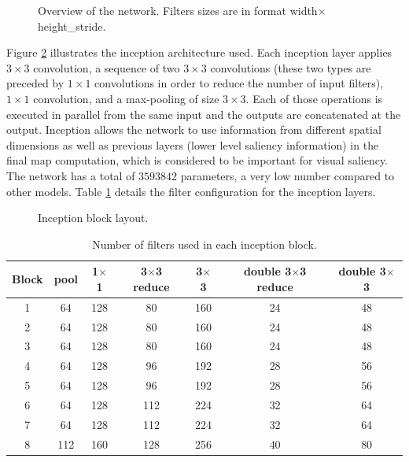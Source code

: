 \documentclass[10pt,twocolumn,letterpaper]{article}
\begin{document}
\begin{figure}
\begin{center}
\def\svgwidth{1.5\columnwidth}

\label{fig:model}
    \caption{Overview of the network.
        Filters sizes are in format width$\times$height\_stride.}
\end{center}
\end{figure}

Figure \ref{fig:newinception} illustrates the inception
architecture used.
Each inception layer applies
$3 \times 3$ convolution, a sequence of two $3 \times 3$ convolutions
(these two types are preceded by $1\times 1$ convolutions in order to
reduce the number of input filters), $1 \times 1$ convolution,
and a max-pooling of size $3 \times 3$.
Each of those operations is executed in parallel from the same input
and the outputs are concatenated at the output.
Inception allows the network to use
information from different spatial dimensions as well as previous
layers (lower level saliency information) in the final map
computation, which is considered to be important for visual saliency.
The network has a total of $3593842$ parameters, a very low number
compared to other models.
Table \ref{table:inception} details the filter configuration for the
inception layers.

\begin{figure}[!htb]
    \centering
    \def\svgwidth{\linewidth}
    
    \caption{Inception block layout.}
   \label{fig:newinception}
\end{figure}

\begin{table}
\begin{center}
\small
\label{table:inception}
\caption{Number of filters used in each inception block.}
\begin{tabular}{|c|c|c|c|c|c|c|}
	\hline
    Block & pool & 1$\times$1 & 3$\times$3 reduce &
    3$\times$3 & double 3$\times$3 reduce & double 3$\times$3\\
    \hline
    1 & 64 & 128 & 80 & 160 & 24 & 48\\
    \hline
    2 & 64 & 128 & 80 & 160 & 24 & 48\\
    \hline
    3 & 64 & 128 & 80 & 160 & 24 & 48\\
    \hline
    4 & 64 & 128 & 96 & 192 & 28 & 56\\
    \hline
    5 & 64 & 128 & 96 & 192 & 28 & 56\\
    \hline
    6 & 64 & 128 & 112 & 224 & 32 & 64\\
    \hline
    7 & 64 & 128 & 112 & 224 & 32 & 64\\
    \hline
    8 & 112 & 160 & 128 & 256 & 40 & 80\\
    \hline
\end{tabular}
\end{center}
\end{table}
\end{document}

